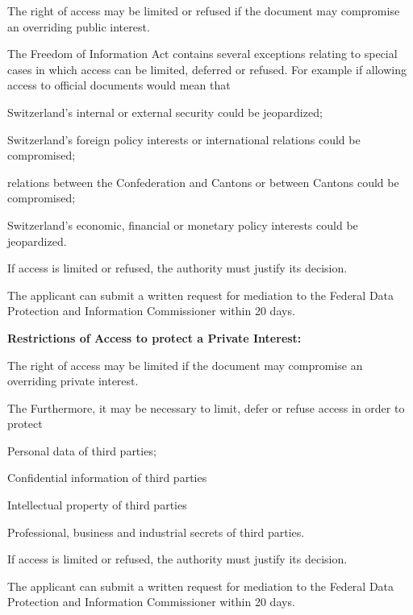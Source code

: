\begin{compactitem}
	\item The right of access may be limited or refused if the document may compromise an overriding public interest.
	\item The Freedom of Information Act contains several exceptions relating to special cases in which access can be limited, deferred or refused. For example if allowing access to official documents would mean that
	\begin{compactitem}
		\item Switzerland's internal or external security could be jeopardized;
		\item Switzerland's foreign policy interests or international relations could be compromised;
		\item relations between the Confederation and Cantons or between Cantons could be compromised;
		\item Switzerland's economic, financial or monetary policy interests could be jeopardized.
	\end{compactitem}
	\item If access is limited or refused, the authority must justify its decision.
	\item The applicant can submit a written request for mediation to the Federal Data Protection and Information Commissioner within 20 days.
\end{compactitem}
\textbf{Restrictions of Access to protect a Private Interest:}
\begin{compactitem}
	\item The right of access may be limited if the document may compromise an overriding private interest.
	\item The Furthermore, it may be necessary to limit, defer or refuse access in order to protect
	\begin{compactitem}
		\item Personal data of third parties;
		\item Confidential information of third parties
		\item Intellectual property of third parties
		\item Professional, business and industrial secrets of third parties.
	\end{compactitem}
	\item If access is limited or refused, the authority must justify its decision.
	\item The applicant can submit a written request for mediation to the Federal Data Protection and Information Commissioner within 20 days.
\end{compactitem}

